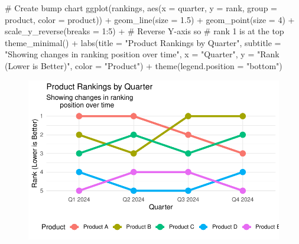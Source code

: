 \documentclass[
  letterpaper,
  DIV=11,
  numbers=noendperiod]{scrartcl}
\newenvironment{Shaded}{\begin{snugshade}}{\end{snugshade}}
\newcommand{\AttributeTok}[1]{\textcolor[rgb]{0.40,0.45,0.13}{#1}}
\newcommand{\CommentTok}[1]{\textcolor[rgb]{0.37,0.37,0.37}{#1}}
\newcommand{\DecValTok}[1]{\textcolor[rgb]{0.68,0.00,0.00}{#1}}
\newcommand{\FloatTok}[1]{\textcolor[rgb]{0.68,0.00,0.00}{#1}}
\newcommand{\FunctionTok}[1]{\textcolor[rgb]{0.28,0.35,0.67}{#1}}
\newcommand{\NormalTok}[1]{\textcolor[rgb]{0.00,0.23,0.31}{#1}}
\newcommand{\SpecialCharTok}[1]{\textcolor[rgb]{0.37,0.37,0.37}{#1}}
\newcommand{\StringTok}[1]{\textcolor[rgb]{0.13,0.47,0.30}{#1}}
\begin{document}
\begin{Shaded}
\begin{Highlighting}[]
\CommentTok{\# Create bump chart}
\FunctionTok{ggplot}\NormalTok{(rankings, }\FunctionTok{aes}\NormalTok{(}\AttributeTok{x =}\NormalTok{ quarter, }\AttributeTok{y =}\NormalTok{ rank, }
                     \AttributeTok{group =}\NormalTok{ product, }\AttributeTok{color =}\NormalTok{ product)) }\SpecialCharTok{+}
  \FunctionTok{geom\_line}\NormalTok{(}\AttributeTok{size =} \FloatTok{1.5}\NormalTok{) }\SpecialCharTok{+}
  \FunctionTok{geom\_point}\NormalTok{(}\AttributeTok{size =} \DecValTok{4}\NormalTok{) }\SpecialCharTok{+}
  \FunctionTok{scale\_y\_reverse}\NormalTok{(}\AttributeTok{breaks =} \DecValTok{1}\SpecialCharTok{:}\DecValTok{5}\NormalTok{) }\SpecialCharTok{+}  \CommentTok{\# Reverse Y{-}axis so }
                                   \CommentTok{\# rank 1 is at the top}
  \FunctionTok{theme\_minimal}\NormalTok{() }\SpecialCharTok{+}
  \FunctionTok{labs}\NormalTok{(}\AttributeTok{title =} \StringTok{"Product Rankings by Quarter"}\NormalTok{,}
       \AttributeTok{subtitle =} \StringTok{"Showing changes in ranking }
\StringTok{       position over time"}\NormalTok{,}
       \AttributeTok{x =} \StringTok{"Quarter"}\NormalTok{,}
       \AttributeTok{y =} \StringTok{"Rank (Lower is Better)"}\NormalTok{,}
       \AttributeTok{color =} \StringTok{"Product"}\NormalTok{) }\SpecialCharTok{+}
  \FunctionTok{theme}\NormalTok{(}\AttributeTok{legend.position =} \StringTok{"bottom"}\NormalTok{)}
\end{Highlighting}
\end{Shaded}

\begin{figure}[H]

{\centering \includegraphics{Ordinal_data_an_R_files/figure-pdf/unnamed-chunk-6-1.pdf}

}

\end{figure}
\end{document}
